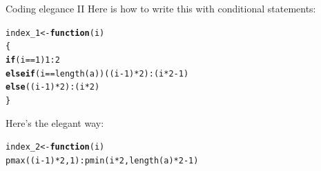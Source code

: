\documentclass[xcolor=table,           xcolor=dvipsnames]{beamer}\usepackage[]{graphicx}\usepackage[]{color}
\makeatletter
\newcommand{\hlnum}[1]{\textcolor[rgb]{0,0,0}{#1}}
\newcommand{\hlopt}[1]{\textcolor[rgb]{0,0,0}{#1}}
\newcommand{\hlstd}[1]{\textcolor[rgb]{0,0,0}{#1}}
\newcommand{\hlkwa}[1]{\textcolor[rgb]{1,0,0}{\textbf{#1}}}
\newcommand{\hlkwb}[1]{\textcolor[rgb]{0,0,0}{#1}}
\newcommand{\hlkwc}[1]{\textcolor[rgb]{1,0,1}{#1}}
\newcommand{\hlkwd}[1]{\textcolor[rgb]{0,0,1}{#1}}
\newenvironment{kframe}{%
 \def\at@end@of@kframe{}%
 \ifinner\ifhmode%
  \def\at@end@of@kframe{\end{minipage}}%
  \begin{minipage}{\columnwidth}%
 \fi\fi%
 \def\FrameCommand##1{\hskip\@totalleftmargin \hskip-\fboxsep
 \colorbox{shadecolor}{##1}\hskip-\fboxsep
     \hskip-\linewidth \hskip-\@totalleftmargin \hskip\columnwidth}%
 \MakeFramed {\advance\hsize-\width
   \@totalleftmargin\z@ \linewidth\hsize
   \@setminipage}}%
 {\par\unskip\endMakeFramed%
 \at@end@of@kframe}
\newenvironment{knitrout}{}{} %
\makeatother
\begin{document}
\begin{frame}[fragile]{Coding elegance II}
Here is how to write this with conditional statements:
\begin{knitrout}
\color{fgcolor}\begin{kframe}
\begin{alltt}
\hlstd{index_1} \hlkwb{<-} \hlkwa{function}\hlstd{(}\hlkwc{i}\hlstd{)}
\hlstd{\{}
\hlkwa{if}\hlstd{(i} \hlopt{==} \hlnum{1}\hlstd{)}                       \hlnum{1} \hlopt{:} \hlnum{2}
\hlkwa{else if}\hlstd{(i} \hlopt{==} \hlkwd{length}\hlstd{(a))  ((i}\hlopt{-}\hlnum{1}\hlstd{)}\hlopt{*}\hlnum{2}\hlstd{)} \hlopt{:} \hlstd{(i}\hlopt{*}\hlnum{2}\hlopt{-}\hlnum{1}\hlstd{)}
\hlkwa{else}                     \hlstd{((i}\hlopt{-}\hlnum{1}\hlstd{)}\hlopt{*}\hlnum{2}\hlstd{)} \hlopt{:} \hlstd{(i}\hlopt{*}\hlnum{2}\hlstd{)}
\hlstd{\}}
\end{alltt}
\end{kframe}
\end{knitrout}
Here's the elegant way:
\begin{knitrout}
\color{fgcolor}\begin{kframe}
\begin{alltt}
\hlstd{index_2} \hlkwb{<-} \hlkwa{function}\hlstd{(}\hlkwc{i}\hlstd{)}
  \hlkwd{pmax}\hlstd{((i}\hlopt{-}\hlnum{1}\hlstd{)}\hlopt{*}\hlnum{2}\hlstd{,} \hlnum{1}\hlstd{)} \hlopt{:} \hlkwd{pmin}\hlstd{(i}\hlopt{*}\hlnum{2}\hlstd{,} \hlkwd{length}\hlstd{(a)}\hlopt{*}\hlnum{2}\hlopt{-}\hlnum{1}\hlstd{)}
\end{alltt}
\end{kframe}
\end{knitrout}
\end{frame}

\end{document}
